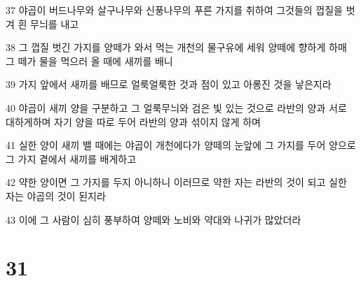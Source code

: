 \par 37 야곱이 버드나무와 살구나무와 신풍나무의 푸른 가지를 취하여 그것들의 껍질을 벗겨 흰 무늬를 내고
\par 38 그 껍질 벗긴 가지를 양떼가 와서 먹는 개천의 물구유에 세워 양떼에 향하게 하매 그 떼가 물을 먹으러 올 때에 새끼를 배니
\par 39 가지 앞에서 새끼를 배므로 얼룩얼룩한 것과 점이 있고 아롱진 것을 낳은지라
\par 40 야곱이 새끼 양을 구분하고 그 얼룩무늬와 검은 빛 있는 것으로 라반의 양과 서로 대하게하며 자기 양을 따로 두어 라반의 양과 섞이지 않게 하며
\par 41 실한 양이 새끼 밸 때에는 야곱이 개천에다가 양떼의 눈앞에 그 가지를 두어 양으로 그 가지 곁에서 새끼를 배게하고
\par 42 약한 양이면 그 가지를 두지 아니하니 이러므로 약한 자는 라반의 것이 되고 실한 자는 야곱의 것이 된지라
\par 43 이에 그 사람이 심히 풍부하여 양떼와 노비와 약대와 나귀가 많았더라

\chapter{31}

